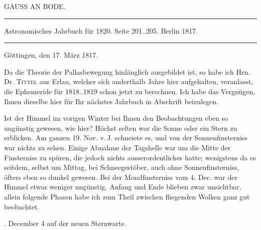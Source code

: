 \clearpage{}\hypertarget{native-404-part-lower}{}\label{native-404-part-lower}
\begin{center}\large GAUSS AN BODE.\end{center}
\begin{center}\hrule\vspace{4pt}\fontsize{10}{12}\selectfont
Astronomisches Jahrbuch für 1820. Seite 201..205. Berlin 1817.\par\vspace{4pt}\hrule\vspace{4pt}\end{center}
\begin{flushright}Göttingen, den 17. März 1817.\end{flushright}
\par\indent Da die Theorie der Pallasbewegung hinlänglich ausgebildet ist, so habe ich Hrn. Dr. \textsc{Tittel} aus Erlau, welcher sich anderthalb Jahre hier aufgehalten, veranlasst, die Ephemeride für 1818..1819 schon  jetzt zu berechnen. Ich habe das Vergnügen, Ihnen dieselbe hier für Ihr nächstes Jahrbuch in Abschrift beizulegen.

\par\indent Ist der Himmel im vorigen Winter bei Ihnen den Beobachtungen eben so ungünstig gewesen, wie hier? Höchst selten war die Sonne oder ein Stern zu erblicken. Am ganzen 19. Nov. v.\,J. schneiete es, und von der Sonnenfinsterniss war nichts zu sehen. Einige Abnahme der Tagshelle war um die Mitte der Finsterniss zu spüren, die jedoch nichts ausserordentliches hatte; wenigstens da es seitdem, selbst um Mittag, bei Schneegestöber, auch ohne Sonnenfinsterniss, öfters eben so dunkel gewesen. Bei der Mondfinsterniss vom 4. Dec. war der Himmel etwas weniger ungünstig. Anfang und Ende blieben zwar unsichtbar, allein folgende Phasen habe ich zum Theil zwischen fliegenden Wolken ganz gut beobachtet.

\par{}. December 4 auf der neuen Sternwarte.

